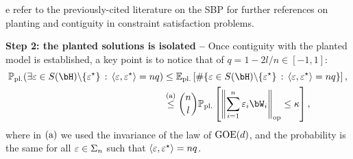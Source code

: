 e refer to the previously-cited literature on the SBP for further references on planting and contiguity in constraint satisfaction problems.

\myskip
\textbf{Step 2: the planted solutions is isolated --}
Once contiguity with the planted model is established, a key point is to notice that of $q = 1 - 2 l / n \in [-1,1]$:
\begin{align*}
    \bbP_\pl(\exists \eps \in S(\bH) \backslash \{\eps^\star\} \, : \, \langle \eps, \eps^\star\rangle = n q) 
    &\leq 
    \EE_\pl \left[\# \{\eps \in S(\bH) \backslash \{\eps^\star\} \, : \, \langle\eps, \eps^\star\rangle = n q\}\right], \\ 
    &\aleq \binom{n}{l} \bbP_{\pl} \left[\left\|\sum_{i=1}^n \eps_i \bW_i\right\|_\op \leq \kappa\right],
\end{align*}
where in $(\rm a)$ we used the invariance of the law of $\mathrm{GOE}(d)$, and the probability is the same for all $\varepsilon \in \Sigma_n$ such that 
$\langle \varepsilon, \varepsilon^\star \rangle = n q$.
